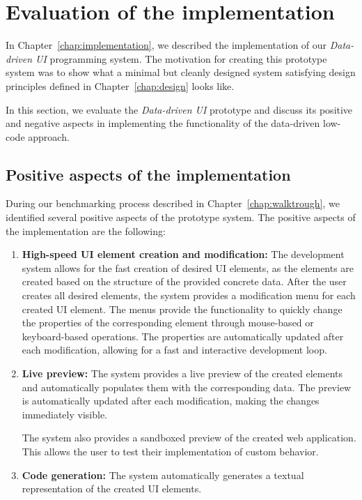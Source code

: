 \section{Evaluation of the implementation}

In Chapter~\ref{chap:implementation}, we described the implementation of our \emph{Data-driven UI} programming system.
The motivation for creating this prototype system was to show what a minimal but cleanly designed system satisfying design principles defined in Chapter~\ref{chap:design} looks like.

In this section, we evaluate the \emph{Data-driven UI} prototype and discuss its positive and negative aspects in implementing the functionality of the data-driven low-code approach.

\subsection{Positive aspects of the implementation}
During our benchmarking process described in Chapter~\ref{chap:walktrough}, we identified several positive aspects of the prototype system.
The positive aspects of the implementation are the following:
\begin{enumerate}
	\item \textbf{High-speed UI element creation and modification:}
	      The development system allows for the fast creation of desired UI elements, as the elements are created based on the structure of the provided concrete data.
	      After the user creates all desired elements, the system provides a modification menu for each created UI element.
	      The menus provide the functionality to quickly change the properties of the corresponding element through mouse-based or keyboard-based operations.
	      The properties are automatically updated after each modification, allowing for a fast and interactive development loop.
	\item \textbf{Live preview:}
	      The system provides a live preview of the created elements and
	      automatically populates them with the corresponding data.
	      The preview is automatically updated after each modification, making the changes immediately visible.

	      The system also provides a sandboxed preview of the created web application.
	      This allows the user to test their implementation of custom behavior.
	\item \textbf{Code generation:}
	      The system automatically generates a textual representation of the created UI elements.
\end{enumerate}



